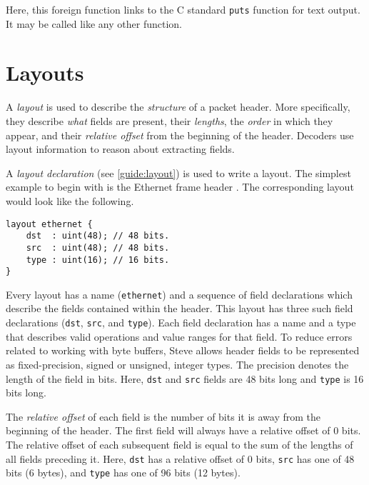 Here, this foreign function links to the C standard \texttt{puts} function
for text output. It may be called like any other function.

\section{Layouts} \label{tut:layout}

A \textit{layout} is used to describe 
the \textit{structure} of a packet header.
More specifically, they describe \textit{what} fields are present, their
\textit{lengths}, the \textit{order} in which they appear, and their
\textit{relative offset} from the beginning of the header. 
Decoders use layout information to reason about extracting fields.


A \emph{layout declaration} (see \ref{guide:layout}) is used to write a layout.
The simplest example to begin with is the Ethernet frame header \cite{eth_std}.
The corresponding layout would look like the following.  

\begin{lstlisting}
layout ethernet {
	dst  : uint(48); // 48 bits.
	src  : uint(48); // 48 bits.
	type : uint(16); // 16 bits.
}
\end{lstlisting}

Every layout has a name (\texttt{ethernet}) and a sequence of field declarations
which describe the fields contained within the header.
This layout has three such field declarations (\texttt{dst}, \texttt{src},
and \texttt{type}).
Each field declaration has a name and a type that describes valid operations and
value ranges for that field.
To reduce errors related to working with byte buffers, Steve allows header fields to
be represented as fixed-precision, signed or unsigned, integer types.
The precision denotes the length of the field in bits.
Here, \texttt{dst} and \texttt{src} fields are 48 bits long and \texttt{type} is
16 bits long.

The \textit{relative offset} of each field is the number of bits it is away
from the beginning of the header. The first field will always have a relative
offset of 0 bits. The relative offset of each subsequent field is equal to the
sum of the lengths of all fields preceding it. Here, \texttt{dst} has a relative
offset of 0 bits, \texttt{src} has one of 48 bits (6 bytes), and \texttt{type} has one of
96 bits (12 bytes).


